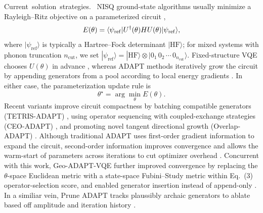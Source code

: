 \documentclass[
  reprint,
  amsmath,
  amssymb,
  aps,
  pra,
  nofootinbib,
  superscriptaddress,
  floatfix
]{revtex4-2}
\newcommand{\tentative}[1]{\textcolor{red!70!black}{#1}}
\newcommand{\structlabel}[1]{\noindent\mbox{\tentative{#1.}}~}
\newcommand{\ket}[1]{|#1\rangle}
\newcommand{\bra}[1]{\langle #1|}
\begin{document}
\structlabel{Current solution strategies}
NISQ ground-state algorithms usually minimize a Rayleigh--Ritz objective on a parameterized circuit \cite{Peruzzo2014,McClean2016,Kandala2017},
\begin{equation}
E(\theta)=
\bra{\psi_{\rm ref}}U^\dagger(\theta)HU(\theta)\ket{\psi_{\rm ref}},
\label{eq:rayleigh_static}
\end{equation}
where \(\ket{\psi_{\mathrm{ref}}}\) is typically a Hartree--Fock determinant \(\ket{\mathrm{HF}}\); for mixed systems with phonon truncation \(n_{\mathrm{cut}}\), we set \(\ket{\psi_{\mathrm{ref}}}=\ket{\mathrm{HF}}\otimes\ket{0_1\,0_2\,\cdots\,0_{n_{\mathrm{cut}}}}\).  Fixed-structure VQE chooses \(U(\theta)\) in advance \cite{Peruzzo2014,McClean2016,Kandala2017}, whereas ADAPT methods iteratively grow the circuit by appending generators from a pool according to local energy gradients \cite{Grimsley2019,Tang2021,Yordanov2021}. In either case, the parameterization update rule is
\begin{equation}
\label{eq:theta_opt}
\theta^\star=\arg\min_\theta E(\theta).
\end{equation}
Recent variants improve circuit compactness by batching compatible generators (TETRIS-ADAPT) \cite{Anastasiou2024}, using operator sequencing with coupled-exchange strategies (CEO-ADAPT) \cite{Ramoa2025}, and promoting novel tangent directional growth (Overlap-ADAPT) \cite{Feniou2023}. Although traditional ADAPT uses first-order gradient information to expand the circuit, second-order information improves convergence \cite{Grimsley2023ADAPT} and allows the warm-start of parameters across iterations to cut optimizer overhead \cite{Ramoa2025HessianRecycling}. Concurrent with this work, Geo-ADAPT-VQE further improved convergence by replacing the \(\theta\)-space Euclidean metric with a state-space Fubini--Study metric within Eq.~(3) operator-selection score, and enabled generator insertion instead of append-only \cite{Sohail2026GeoADAPT}. In a similiar vein, Prune ADAPT tracks plaussibly archaic generators to ablate based off amplitude and iteration history \cite{Vaquero2025PrunedADAPT}.
\end{document}
